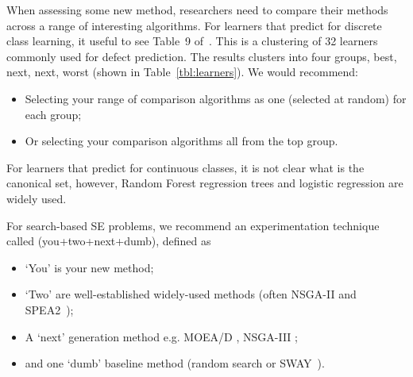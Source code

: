 \documentclass[preprint,10pt]{elsarticle}
\begin{document}
When assessing some new method, researchers need to compare their methods across a range of interesting algorithms.  For learners that predict for discrete class learning,  it useful to see Table~9 of~\cite{ghotra2015}. This is a clustering of 32 learners commonly used for defect prediction. The results clusters into four groups, best, next, next, worst
(shown in Table~\ref{tbl:learners}). We would recommend:
\begin{itemize}
\item
Selecting your range of comparison algorithms as one (selected at random) for each group;
\item 
Or selecting your comparison algorithms all from the top group.
\end{itemize}

For learners that predict for continuous classes, it is not clear what is the canonical set, however, Random Forest regression trees and logistic regression are widely used. 
 
For search-based SE problems, we recommend an experimentation technique called (you+two+next+dumb), defined as
\begin{itemize}
\item
`You' is your new method;
\item
`Two' are well-established widely-used methods (often NSGA-II and SPEA2~\cite{sayyad2013});
\item A `next' generation method e.g. MOEA/D \cite{zhang2007moea}, NSGA-III \cite{deb14};
\item and one `dumb' baseline method (random search or SWAY~\cite{chen2018}).
\end{itemize}

 

 


\end{document}
